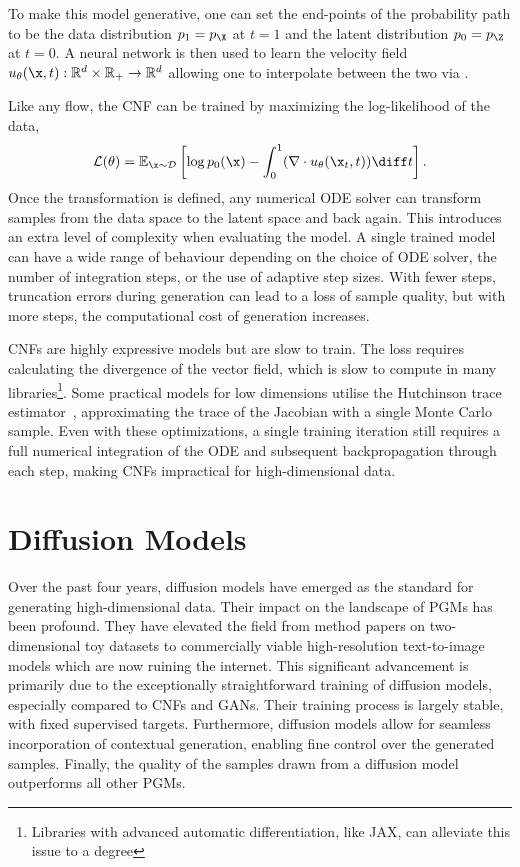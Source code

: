 To make this model generative, one can set the end-points of the probability path to be the data distribution $p_1 = p_\X$ at $t=1$ and the latent distribution $p_0 = p_\Z$ at $t=0$.
A neural network is then used to learn the velocity field $u_\theta(\x, t): \mathbb{R}^d \times \mathbb{R}_{+} \rightarrow \mathbb{R}^d$ allowing one to interpolate between the two via .

Like any flow, the CNF can be trained by maximizing the log-likelihood of the data,
\begin{equation}
    \label{eq:cnf_loss}
    \mathcal{L}(\theta) = \mathbb{E}_{\x \sim \mathcal{D}}\left[\log p_0(\x) - \int_0^1 (\nabla \cdot u_\theta(\x_t, t)) \diff t\right].
\end{equation}
Once the transformation is defined, any numerical ODE solver can transform samples from the data space to the latent space and back again.
This introduces an extra level of complexity when evaluating the model.
A single trained model can have a wide range of behaviour depending on the choice of ODE solver, the number of integration steps, or the use of adaptive step sizes.
With fewer steps, truncation errors during generation can lead to a loss of sample quality, but with more steps, the computational cost of generation increases.

CNFs are highly expressive models but are slow to train.
The loss requires calculating the divergence of the vector field, which is slow to compute in many libraries\footnote{Libraries with advanced automatic differentiation, like JAX\cite{JAX}, can alleviate this issue to a degree}.
Some practical models for low dimensions utilise the Hutchinson trace estimator~\cite{FFJORD},  approximating the trace of the Jacobian with a single Monte Carlo sample.
Even with these optimizations, a single training iteration still requires a full numerical integration of the ODE and subsequent backpropagation through each step, making CNFs impractical for high-dimensional data.


\section{Diffusion Models}

Over the past four years, diffusion models have emerged as the standard for generating high-dimensional data.
Their impact on the landscape of PGMs has been profound.
They have elevated the field from method papers on two-dimensional toy datasets to commercially viable high-resolution text-to-image models which are now ruining the internet.
This significant advancement is primarily due to the exceptionally straightforward training of diffusion models, especially compared to CNFs and GANs.
Their training process is largely stable, with fixed supervised targets.
Furthermore, diffusion models allow for seamless incorporation of contextual generation, enabling fine control over the generated samples.
Finally, the quality of the samples drawn from a diffusion model outperforms all other PGMs.


